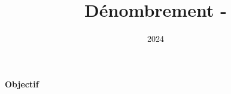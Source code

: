 \documentclass[10pt,a4paper]{article}
\title{Dénombrement - }
\author{}
\date{2024}
\begin{document}
\textbf{Objectif}
\end{document}
